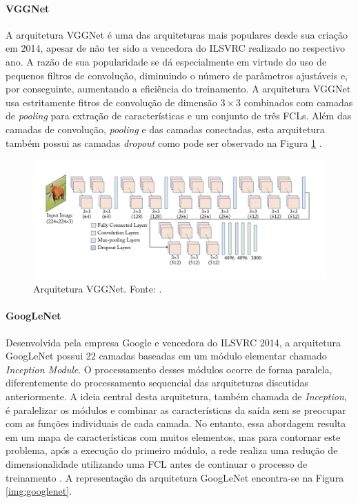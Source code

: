 \paragraph{VGGNet} A arquitetura VGGNet é uma das arquiteturas mais populares desde sua criação em 2014, apesar de não ter sido a vencedora do ILSVRC realizado no respectivo ano. A razão de sua popularidade se dá especialmente em virtude do uso de pequenos filtros de convolução, diminuindo o número de parâmetros ajustáveis e, por conseguinte, aumentando a eficiência do treinamento. A arquitetura VGGNet usa estritamente fitros de convolução de dimensão $3 \times 3$ combinados com camadas de \textit{pooling} para extração de características e um conjunto de três FCLs. Além das camadas de convolução, \textit{pooling} e das camadas conectadas, esta arquitetura também possui as camadas \textit{dropout} como pode ser observado na Figura \ref{img:vggnet} \cite{ref:khan}.

\begin{figure}[!ht]
	\centering
	\caption{Arquitetura VGGNet. Fonte: \cite{ref:khan}.}
	\label{img:vggnet}
	\includegraphics[width=1\textwidth]{./img/vggnet}

\end{figure}

\paragraph{GoogLeNet} Desenvolvida pela empresa Google e vencedora do ILSVRC 2014, a arquitetura GoogLeNet possui $22$ camadas baseadas em um módulo elementar chamado \emph{Inception Module}. O processamento desses módulos ocorre de forma paralela, diferentemente do processamento sequencial das arquiteturas discutidas anteriormente. A ideia central desta arquitetura, também chamada de \emph{Inception}, é paralelizar os módulos e combinar as características da saída sem se preocupar com as funções individuais de cada camada. No entanto, essa abordagem resulta em um mapa de características com muitos elementos, mas para contornar este problema, após a execução do primeiro módulo, a rede realiza uma redução de dimensionalidade utilizando uma FCL antes de continuar o processo de treinamento \cite{ref:khan}. A representação da arquitetura GoogLeNet encontra-se na Figura \ref{img:googlenet}.

